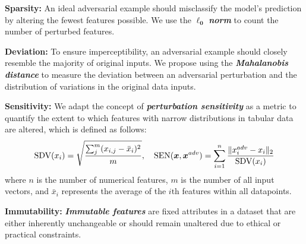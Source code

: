 \documentclass[portrait,a0paper,margin=17mm,fontscale=0.292]{baposter}
\begin{document}
\begin{poster}
{    \vspace{0.3em}
    \textbf{\color{blue}Sparsity:} An ideal adversarial example should misclassify the model's prediction by altering the fewest features possible. We use the $\bm{\ell_0}$ \textbf{\textit{norm}} to count the number of perturbed features.

    \vspace{0.3em}
    \textbf{\color{blue}Deviation:} To ensure imperceptibility, an adversarial example should closely resemble the majority of original inputs. We propose using the \textbf{\textit{Mahalanobis distance}} to measure the deviation between an adversarial perturbation and the distribution of variations in the original data inputs.

    \vspace{0.3em}
    \textbf{\color{blue}Sensitivity:} We adapt the concept of \textit{\textbf{perturbation sensitivity}} as a metric to quantify the extent to which features with narrow distributions in tabular data are altered, which is defined as follows:
\vspace{-0.3em}
\begin{equation*}
       \text{SDV}(x_{i})= \sqrt{ \frac{ \sum^m_j ( x_{i,j}- \bar{x}_{i})^2 }{ m } }, \quad\text{SEN}(\bm{x}, \bm{x}^{adv})=\sum_{i=1}^n \frac{\Vert x^{adv}_{i} - x_{i} \Vert_2}{\text{SDV}(x_i)}
\vspace{-0.3em}
\end{equation*}
where $n$ is the number of numerical features, $m$ is the number of all input vectors, and $\bar{x}_{i}$ represents the average of the $i\text{th}$ features within all datapoints.
    


\vspace{0.3em}
\textbf{\color{blue}Immutability:} \textbf{\textit{Immutable features}} are fixed attributes in a dataset that are either inherently unchangeable or should remain unaltered due to ethical or practical constraints.

}
\end{poster}
\end{document}
